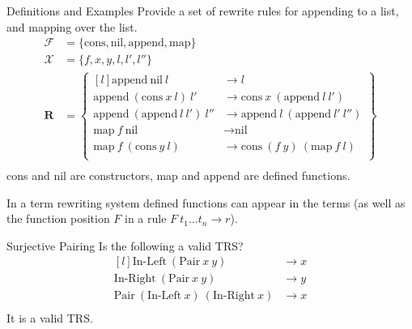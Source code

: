\begin{examplebox}{Definitions and Examples}
	Provide a set of rewrite rules for appending to a list, and mapping over the list.
	\tcblower
	\[\begin{split}
			\mathcal{F} &= \{\text{cons}, \text{nil}, \text{append}, \text{map}\} \\
			\mathcal{X} & = \{f, x, y, l, l', l''\} \\
			\mathbf{R} &= \begin{Bmatrix*}[l]
				\text{append} \ \text{nil} \ l & \to l \\
				\text{append} \ (\text{cons} \ x \ l) \ l' & \to \text{cons} \ x \ (\text{append} \ l \ l') \\
				\text{append} \ (\text{append} \ l \ l') \ l'' & \to \text{append} \ l \ (\text{append} \ l' \ l'') \\
				\text{map} \ f \ \text{nil} & \to \text{nil} \\
				\text{map} \ f \ (\text{cons} \ y \ l) & \to \text{cons} \ (f \ y) \ (\text{map} \ f \ l) \\
			\end{Bmatrix*} \\
		\end{split}\]
	cons and nil are constructors, map and append are defined functions.
\end{examplebox}

In a term rewriting system defined functions can appear in the terms (as well as the function position $F$ in a rule $F \ t_1 \dots t_n \to r$).

\begin{examplebox}{Surjective Pairing}
	Is the following a valid TRS?
	\[\begin{matrix*}[l]
			\text{In-Left} \ (\text{Pair} \ x \ y) & \to x \\
			\text{In-Right} \ (\text{Pair} \ x \ y) & \to y \\
			\text{Pair} \ (\text{In-Left} \ x) \ (\text{In-Right} \ x) & \to x \\
		\end{matrix*}\]
	\tcblower
	It is a valid TRS.
\end{examplebox}

